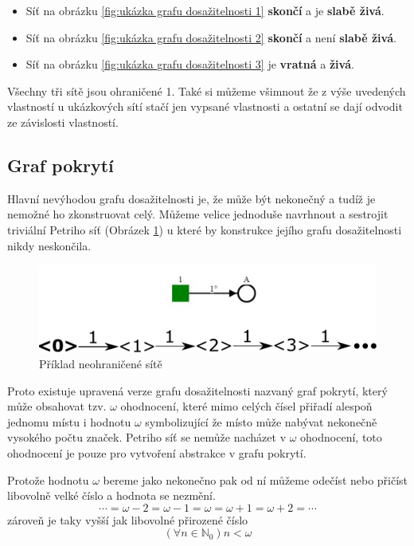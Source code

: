 \documentclass[
  biblatex,
  glossaries,
  printversion
]{kidiplom}
\begin{document}
\begin{itemize}
  \item 
  Síť na obrázku \ref{fig:ukázka grafu dosažitelnosti 1} \textbf{skončí} a je \textbf{slabě živá}.
  \item 
  Síť na obrázku \ref{fig:ukázka grafu dosažitelnosti 2} \textbf{skončí} a není \textbf{slabě živá}.
  \item 
  Síť na obrázku \ref{fig:ukázka grafu dosažitelnosti 3} je \textbf{vratná} a \textbf{živá}.
\end{itemize}

Všechny tři sítě jsou ohraničené 1. Také si můžeme všimnout že 
z výše uvedených vlastností u ukázkových sítí 
stačí jen vypsané vlastnosti a ostatní se dají odvodit ze závislosti vlastností.


\subsection{Graf pokrytí}

Hlavní nevýhodou grafu dosažitelnosti je, že může být
nekonečný a tudíž je nemožné ho zkonstruovat celý.
Můžeme velice jednoduše navrhnout a sestrojit triviální Petriho síť (Obrázek \ref{fig:neohraničená síť}) u které by konstrukce jejího grafu dosažitelnosti nikdy neskončila.

\begin{figure}[h]
  \centering
  \includegraphics[width=\linewidth]{net_unbounded_reachability}
  \caption{Příklad neohraničené sítě}\label{fig:neohraničená síť}
\end{figure}

Proto existuje upravená verze grafu dosažitelnosti nazvaný graf pokrytí,
který může obsahovat tzv. $\omega$ ohodnocení, které mimo celých 
čísel přiřadí alespoň jednomu místu i hodnotu $\omega$ 
symbolizující že místo může nabývat nekonečně vysokého počtu značek.
Petriho síť se nemůže nacházet v $\omega$ ohodnocení, toto ohodnocení je pouze
pro vytvoření abstrakce v grafu pokrytí.

Protože hodnotu $\omega$ bereme jako nekonečno pak od ní můžeme 
odečíst nebo přičíst libovolně velké číslo a hodnota se nezmění.
$$\dotsb = \omega - 2 = \omega - 1 = \omega = \omega + 1 = \omega + 2 = \dotsb$$
zároveň je taky vyšší jak libovolné přirozené číslo
$$ (\forall n \in \mathbb{N}_0)n < \omega $$
\end{document}
